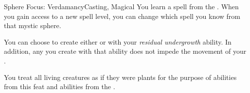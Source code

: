 \begin{feat}{Sphere Focus: Verdamancy}{Casting, Magical}
         You learn a spell from the  .
        When you gain access to a new spell level, you can change which spell you know from that mystic sphere.

         You can choose to create either  or  with your \textit{residual undergrowth} ability.
        In addition, any  you create with that ability does not impede the movement of your .

         You treat all living creatures as if they were plants for the purpose of abilities from this feat and abilities from the  .
    \end{feat}

